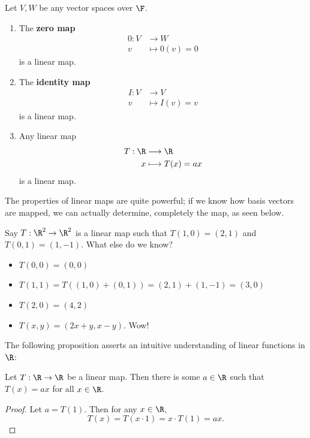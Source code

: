 \documentclass[math0540-lecture-notes.tex]{subfiles}
\begin{document}
\begin{example}
  Let $V,W$ be any vector spaces over $\F$.
  \begin{enumerate}
    \item The \textbf{zero map}  \begin{align*}
        0: V &\longrightarrow W \\
        v &\longmapsto 0(v) = 0 
      \end{align*} is a linear map.

    \item The \textbf{identity map} \begin{align*}
        I: V &\longrightarrow V \\
        v &\longmapsto I(v) = v
      \end{align*} is a linear map. 

    \item Any linear map \begin{align*}
        T: \R &\longrightarrow \R \\
        x &\longmapsto T(x) = ax
      \end{align*} is a linear map.
  \end{enumerate}
\end{example}

The properties of linear maps are quite powerful; if we know how basis vectors are mapped, we can
actually determine, completely the map, as seen below.

\begin{example}
  Say $T:\R^2\to \R^2$ is a linear map such that $T(1,0)=(2,1)$ and  $T(0,1)=(1,-1)$. What else do
  we know?
   \begin{itemize}
     \item $T(0,0)=(0,0)$
     \item  $T(1,1)=T((1,0)+(0,1))=(2,1)+(1,-1)=(3,0)$
     \item  $T(2,0)=(4,2)$
     \item $T(x,y)=(2x+y,x-y)$. Wow!
  \end{itemize}
\end{example}

The following proposition asserts an intuitive understanding of linear functions in $\R$:

\begin{proposition}{}
  Let $T:\R\to \R$ be a linear map. Then there is some $a\in \R$ such that $T(x)=ax$ for all  $x\in
  \R$.
\end{proposition}
\begin{proof}[Proof]
  Let $a=T(1)$. Then for any $x\in \R$, \[
    T(x) = T(x\cdot 1) = x\cdot T(1) = ax
  .\] 
\end{proof}
\end{document}
